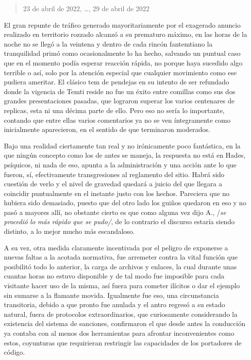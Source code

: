 \documentclass[
]{book}
\begin{document}
\begin{quote}
23 de abril de 2022, \ldots, 29 de abril de 2022
\end{quote}

El gran repunte de tráfico generado mayoritariamente por el exagerado anuncio realizado en territorio rozzado alcanzó a su prematuro máximo, en las horas de la noche no se llegó a la veintena y dentro de cada rincón fantemtiano la tranquilidad primó como ocasionalmente lo ha hecho, salvando un puntual caso que en el momento podía esperar reacción rápida, no porque haya sucedido algo terrible o así, solo por la atención especial que cualquier movimiento como ese pudiera ameritar. El clásico tem de pendejas en su intento de ser refundado donde la vigencia de Temti reside no fue un éxito entre comillas como sus dos grandes presentaciones pasadas, que lograron superar los varios centenares de replicas, esta ni una décima parte de ello. Pero eso no sería lo importante, contando que entre ellas varios comentarios ya no se ven íntegramente como inicialmente aparecieron, en el sentido de que terminaron moderados.

Bajo una realidad ciertamente tan real y no irónicamente poco fantástica, en la que ningún concepto como los de antes se maneja, la respuesta no está en Hades, psíquicos, ni nada de eso, apunta a la administración y una acción ante lo que fueron, sí, efectivamente transgresiones al reglamento del sitio. Habrá sido cuestión de verlo y el nivel de gravedad quedará a juicio del que llegara a coincidir puntualmente en el instante justo con los hechos. Pareciera que no hubiera sido demasiado, puesto que del otro lado los guiños quedaron en eso y no pasó a mayores allí, no obstante cierto es que como alguna vez dijo A., /\emph{se procedió lo más rápido que se pudo/}, de lo contrario el discurso estaría siendo distinto, a lo mejor mucho más escandaloso.

A su vez, otra medida claramente incentivada por el peligro de exponerse a nuevas faltas a la acotada normativa, fue arremeter contra la vital función que posibilitó todo lo anterior, la carga de archivos y enlaces, la cual durante unas cuantas horas no estuvo disponible y de tal modo fue imposible para cada visitante hacer uso de la misma, así fuera para cometer ilícitos o dar el ejemplo sin sumarse a la flamante movida. Igualmente fue eso, una circunstancia transitoria, debido a que pronto fue anulada y el antro regresó a su estado natural, fuera de protocolos extraordinarios, que curiosamente considerando la existencia del sistema de sanciones, confirmaron el que desde antes la conducción ya contaba con al menos dos herramientas para afrontar inconvenientes como estos, coyunturas que requirieran restringir las capacidades de los portadores de código.
\end{document}
